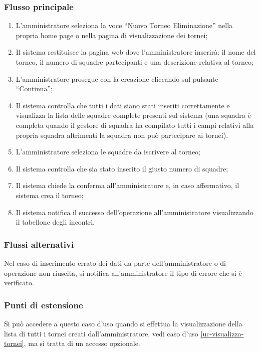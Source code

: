 \subsubsection*{Flusso principale}

\begin{enumerate}
	
	\item
	L'amministratore seleziona la voce ``Nuovo Torneo Eliminazione'' nella propria home page o nella pagina di visualizzazione dei tornei;
	
	\item
	Il sistema restituisce la pagina web dove l'amministratore inserirà: il nome del torneo, il numero di squadre partecipanti e una descrizione relativa al torneo;
	
	\item
	L'amministratore prosegue con la creazione cliccando sul pulsante ``Continua'';
	
	\item
	Il sistema controlla che tutti i dati siano stati inseriti correttamente e visualizza la lista delle squadre complete presenti sul sistema (una squadra è completa quando il gestore di squadra ha compilato tutti i campi relativi alla propria squadra altrimenti la squadra non può partecipare ai tornei).
	
	\item
	L'amministratore seleziona le squadre da iscrivere al torneo;
	
	\item
	Il sistema controlla che sia stato inserito il giusto numero di squadre;
	
	\item
	Il sistema chiede la conferma all'amministratore e, in caso affermativo, il sistema crea il torneo;
	
	\item
	Il sistema notifica il successo dell'operazione all'amministratore visualizzando il tabellone degli incontri.
	
\end{enumerate}

\subsubsection*{Flussi alternativi}
Nel caso di inserimento errato dei dati da parte dell'amministratore o di operazione non riuscita, si notifica all'amministratore il tipo di errore che si è verificato.

\subsubsection*{Punti di estensione}
Si può accedere a questo caso d'uso quando si effettua la visualizzazione della lista di tutti i tornei creati dall'amministratore, vedi caso d'uso \vref{uc-visualizza-tornei}, ma si tratta di un accesso opzionale.


